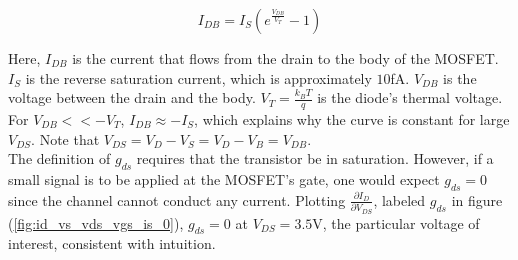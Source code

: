 \begin{equation}
	\label{eq:shockley_diode}
	I_{DB} = I_{S} ( e^{ \frac{ V_{DB} }{ V_{T} } } - 1 )
\end{equation}

Here, $I_{DB}$ is the current that flows from the drain to the body of the MOSFET.
$I_{S}$ is the reverse saturation current, which is approximately $10$\si{\femto\ampere}.
$V_{DB}$ is the voltage between the drain and the body.
$V_{T} = \frac{ k_{B} T }{ q }$ is the diode's thermal voltage.
For $V_{DB} << -V_{T}$, $I_{DB} \approx -I_{S}$, which explains why the curve is constant for large $V_{DS}$.
Note that $V_{DS} = V_{D} - V_{S} = V_{D} - V_{B} = V_{DB}$. \\

The definition of $g_{ds}$ requires that the transistor be in saturation.
However, if a small signal is to be applied at the MOSFET's gate, one would expect $g_{ds} = 0$ since the channel cannot conduct any current.
Plotting $\frac{ \partial I_{D} }{ \partial V_{DS} }$, labeled $g_{ds}$ in figure (\ref{fig:id_vs_vds_vgs_is_0}), $g_{ds} = 0$ at $V_{DS} = 3.5$\si{\volt}, the particular voltage of interest, consistent with intuition. \\
